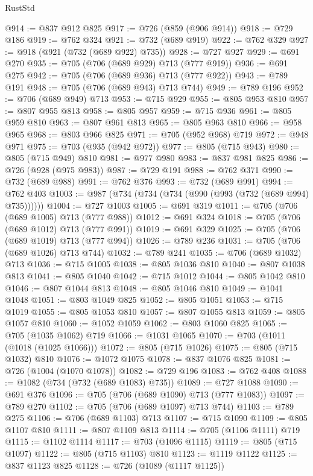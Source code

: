 \begin{lexlean}{RustStd}
\begin{coremodule}
@914 := @837 @912 @825
@917 := @726 (@859 (@906 @914))
@918 := @729 @186
@919 := @762 @324
@921 := @732 (@689 @919)
@922 := @762 @329
@927 := @918 (@921 (@732 (@689 @922) @735))
@928 := @727 @927
@929 := @691 @270
@935 := @705 (@706 (@689 @929) @713 (@777 @919))
@936 := @691 @275
@942 := @705 (@706 (@689 @936) @713 (@777 @922))
@943 := @789 @191
@948 := @705 (@706 (@689 @943) @713 @744)
@949 := @789 @196
@952 := @706 (@689 @949) @713
@953 := @715 @929
@955 := @805 @953 @810
@957 := @807 @955 @813
@958 := @805 @957
@959 := @715 @936
@961 := @805 @959 @810
@963 := @807 @961 @813
@965 := @805 @963 @810
@966 := @958 @965
@968 := @803 @966 @825
@971 := @705 (@952 @968) @719
@972 := @948 @971
@975 := @703 (@935 (@942 @972))
@977 := @805 (@715 @943)
@980 := @805 (@715 @949) @810
@981 := @977 @980
@983 := @837 @981 @825
@986 := @726 (@928 (@975 @983))
@987 := @729 @191
@988 := @762 @371
@990 := @732 (@689 @988)
@991 := @762 @376
@993 := @732 (@689 @991)
@994 := @762 @403
@1003 := @987 (@734 (@734 (@734 (@990 (@993 (@732 (@689 @994) @735))))))
@1004 := @727 @1003
@1005 := @691 @319
@1011 := @705 (@706 (@689 @1005) @713 (@777 @988))
@1012 := @691 @324
@1018 := @705 (@706 (@689 @1012) @713 (@777 @991))
@1019 := @691 @329
@1025 := @705 (@706 (@689 @1019) @713 (@777 @994))
@1026 := @789 @236
@1031 := @705 (@706 (@689 @1026) @713 @744)
@1032 := @789 @241
@1035 := @706 (@689 @1032) @713
@1036 := @715 @1005
@1038 := @805 @1036 @810
@1040 := @807 @1038 @813
@1041 := @805 @1040
@1042 := @715 @1012
@1044 := @805 @1042 @810
@1046 := @807 @1044 @813
@1048 := @805 @1046 @810
@1049 := @1041 @1048
@1051 := @803 @1049 @825
@1052 := @805 @1051
@1053 := @715 @1019
@1055 := @805 @1053 @810
@1057 := @807 @1055 @813
@1059 := @805 @1057 @810
@1060 := @1052 @1059
@1062 := @803 @1060 @825
@1065 := @705 (@1035 @1062) @719
@1066 := @1031 @1065
@1070 := @703 (@1011 (@1018 (@1025 @1066)))
@1072 := @805 (@715 @1026)
@1075 := @805 (@715 @1032) @810
@1076 := @1072 @1075
@1078 := @837 @1076 @825
@1081 := @726 (@1004 (@1070 @1078))
@1082 := @729 @196
@1083 := @762 @408
@1088 := @1082 (@734 (@732 (@689 @1083) @735))
@1089 := @727 @1088
@1090 := @691 @376
@1096 := @705 (@706 (@689 @1090) @713 (@777 @1083))
@1097 := @789 @270
@1102 := @705 (@706 (@689 @1097) @713 @744)
@1103 := @789 @275
@1106 := @706 (@689 @1103) @713
@1107 := @715 @1090
@1109 := @805 @1107 @810
@1111 := @807 @1109 @813
@1114 := @705 (@1106 @1111) @719
@1115 := @1102 @1114
@1117 := @703 (@1096 @1115)
@1119 := @805 (@715 @1097)
@1122 := @805 (@715 @1103) @810
@1123 := @1119 @1122
@1125 := @837 @1123 @825
@1128 := @726 (@1089 (@1117 @1125))

\end{coremodule}
\end{lexlean}
